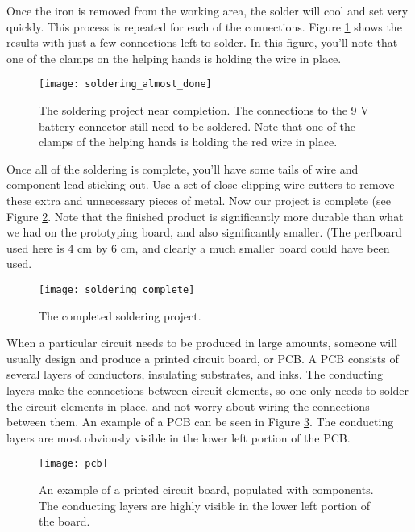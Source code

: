 Once the iron is removed from the working area, the solder will cool and set
very quickly.
This process is repeated for each of the
connections. Figure \ref{fig:soldering_almost_done} shows the results with just
a few connections left to solder. In this figure, you'll note that one of the
clamps on the helping hands is holding the wire in place.
\begin{figure}[hbp!]
\centering
\texttt{[image: soldering\_almost\_done]}
\caption[Soldering project near completion]{The soldering project near 
completion. The connections to the 9 V battery connector still need to be
soldered. Note that one of the clamps of the helping hands is holding the red
wire in place.}
\label{fig:soldering_almost_done}
\end{figure}

Once all of the soldering is complete, you'll have some tails of wire and
component lead sticking out. Use a set of close clipping wire cutters to remove
these extra and unnecessary pieces of metal. Now our project is complete
(see Figure \ref{fig:soldering_complete}. Note that the finished product is
significantly more durable than what we had on the prototyping board, and also
significantly smaller. (The perfboard used here is 4 cm by 6 cm, and clearly a much smaller board could have been used.
\begin{figure}[hbp!]
\centering
\texttt{[image: soldering\_complete]}
\caption[The completed soldering project]{The completed soldering project.}
\label{fig:soldering_complete}
\end{figure}

When a particular circuit needs to be produced in large amounts, someone will
usually design and produce a printed circuit board, or PCB. A PCB consists of 
several layers of conductors, insulating substrates, and inks. The conducting
layers make the connections between circuit elements, so one only needs to
solder the circuit elements in place, and not worry about wiring the 
connections between them. An example of a PCB can be seen in Figure
\ref{fig:pcb}. The conducting layers are most obviously visible in the
lower left portion of the PCB.
\begin{figure}[hbp!]
\centering
\texttt{[image: pcb]}
\caption[A printed circuit board]{An example of a printed circuit board,
populated with components. The conducting layers are highly visible in the 
lower left portion of the board.}
\label{fig:pcb}
\end{figure}

